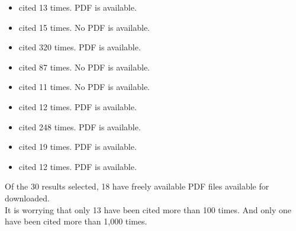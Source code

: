 \begin{itemize}
\item \cite{majid2011organizational} cited 13 times. PDF is available.
\item \cite{buchta2003technological} cited 15 times. No PDF is available.
\item \cite{besson2012strategizing} cited 320 times. PDF is available.
\item \cite{hannan1986uncertainty} cited 87 times. No PDF is available.
\item \cite{haag2014organizational} cited 11 times. No PDF is available.
\item \cite{nedzinskas2014dynamic} cited 12 times. PDF is available.
\item \cite{reger1994creating} cited 248 times. PDF is available.
\item \cite{chen2014revisiting} cited 19 times. PDF is available.
\item \cite{hung2015sustained} cited 12 times. PDF is available.
\end{itemize}

Of the 30 results selected, 18 have freely available PDF files available for downloaded.\\

It is worrying that only 13 have been cited more than 100 times. And only one have been cited more than 1,000 times.\\
